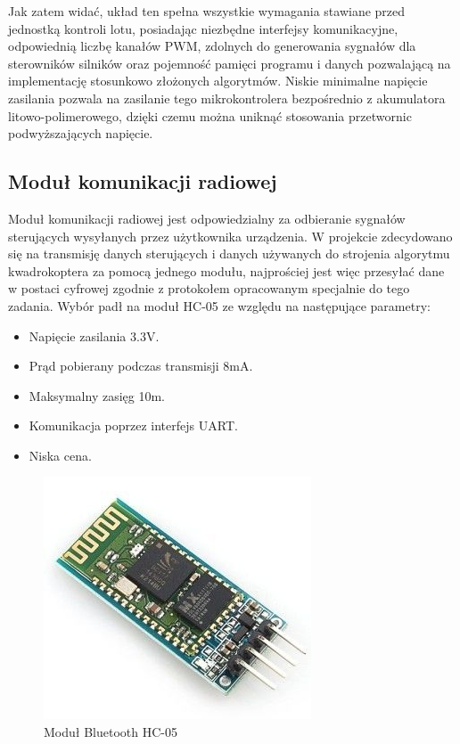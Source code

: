 Jak zatem widać, układ ten spełna wszystkie wymagania stawiane przed jednostką kontroli lotu, posiadając niezbędne interfejsy komunikacyjne, odpowiednią liczbę kanałów PWM, zdolnych do generowania sygnałów dla sterowników silników oraz pojemność pamięci programu i danych pozwalającą na implementację stosunkowo złożonych algorytmów. Niskie minimalne napięcie zasilania pozwala na zasilanie tego mikrokontrolera bezpośrednio z akumulatora litowo-polimerowego, dzięki czemu można uniknąć stosowania przetwornic podwyższających napięcie.

\subsection{Moduł komunikacji radiowej}
Moduł komunikacji radiowej jest odpowiedzialny za odbieranie sygnałów sterujących wysyłanych przez użytkownika urządzenia. W projekcie zdecydowano się na transmisję danych sterujących i danych używanych do strojenia algorytmu kwadrokoptera za pomocą jednego modułu, najprościej jest więc przesyłać dane w postaci cyfrowej zgodnie z protokołem opracowanym specjalnie do tego zadania. Wybór padł na moduł HC-05 ze względu na następujące parametry:

\begin{itemize}
	\item Napięcie zasilania 3.3V.
	\item Prąd pobierany podczas transmisji 8mA.
	\item Maksymalny zasięg 10m.
	\item Komunikacja poprzez interfejs UART.
	\item Niska cena.
\end{itemize}

\begin{figure}[H]
	\centering
	\includegraphics[scale=0.7]{Pictures/HC-05.jpg}
		\caption[Moduł Bluetooth HC-05]{Moduł Bluetooth HC-05}
	\label{fig:hc-05}
\end{figure}


